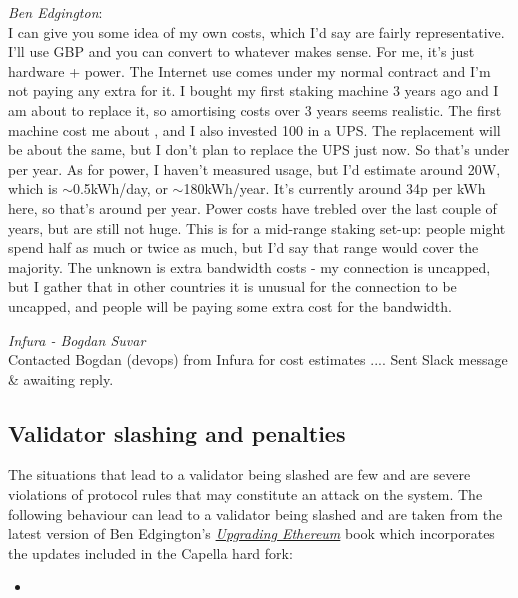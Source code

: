 \documentclass[UTF8]{article}
\begin{document}
\noindent
\textit{Ben Edgington}: \\
I can give you some idea of my own costs, which I'd say are fairly representative. I'll use GBP and you can convert to whatever makes sense. For me, it's just hardware + power. The Internet use comes under my normal contract and I'm not paying any extra for it. I bought my first staking machine 3 years ago and I am about to replace it, so amortising costs over 3 years seems realistic. The first machine cost me about , and I also invested 100 in a UPS. The replacement will be about the same, but I don't plan to replace the UPS just now. So that's under  per year.
As for power, I haven't measured usage, but I'd estimate around 20W, which is $\sim$0.5kWh/day, or $\sim$180kWh/year. It's currently around 34p per kWh here, so that's around  per year. Power costs have trebled over the last couple of years, but are still not huge.
This is for a mid-range staking set-up: people might spend half as much or twice as much, but I'd say that range would cover the majority. The unknown is extra bandwidth costs - my connection is uncapped, but I gather that in other countries it is unusual for the connection to be uncapped, and people will be paying some extra cost for the bandwidth.

\noindent
\textit{Infura - Bogdan Suvar}\\
Contacted Bogdan (devops) from Infura for cost estimates .... Sent Slack message \& awaiting reply.

\subsection{Validator slashing and penalties}
\label{slashing}
The situations that lead to a validator being slashed are few and are severe violations of protocol rules that may constitute an attack on the system.
The following behaviour can lead to a validator being slashed and are taken from the latest version of Ben Edgington's  \href{https://eth2book.info/capella/part2/incentives/slashing/}{\textit{Upgrading Ethereum}} book which incorporates the updates included in the Capella hard fork:
\begin{itemize}
\item 
\end{itemize}
\end{document}
